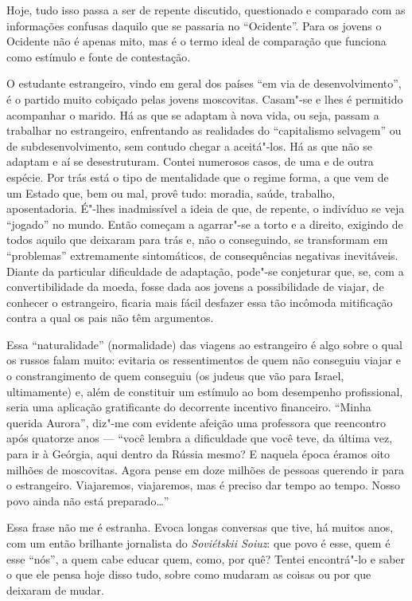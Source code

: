 Hoje, tudo isso passa a ser de repente discutido, questionado e comparado com as informações confusas daquilo que se passaria no ``Ocidente''. Para os jovens o Ocidente não é apenas mito, mas é o termo ideal de comparação que funciona como estímulo e fonte de contestação.

O estudante estrangeiro, vindo em geral dos países ``em via de desenvolvimento'', é o partido muito cobiçado pelas jovens moscovitas. Casam"-se e lhes é permitido acompanhar o marido. Há as que se adaptam à nova vida, ou seja, passam a trabalhar no estrangeiro, enfrentando as realidades do ``capitalismo selvagem'' ou de subdesenvolvimento, sem contudo chegar a aceitá"-los. Há as que não se adaptam e aí se desestruturam. Contei numerosos casos, de uma e de outra espécie. Por trás está o tipo de mentalidade que o regime forma, a que vem de um Estado que, bem ou mal, provê tudo: moradia, saúde, trabalho, aposentadoria. É"-lhes inadmissível a ideia de que, de repente, o indivíduo se veja ``jogado'' no mundo. Então começam a agarrar"-se a torto e a direito, exigindo de todos aquilo que deixaram para trás e, não o conseguindo, se transformam em ``problemas'' extremamente sintomáticos, de consequências negativas inevitáveis. Diante da particular dificuldade de adaptação, pode"-se conjeturar que, se, com a convertibilidade da moeda, fosse dada aos jovens a possibilidade de viajar, de conhecer o estrangeiro, ficaria mais fácil desfazer essa tão incômoda mitificação contra a qual os pais não têm argumentos.

Essa ``naturalidade'' (normalidade) das viagens ao estrangeiro é algo sobre o qual os russos falam muito: evitaria os ressentimentos de quem não conseguiu viajar e o constrangimento de quem conseguiu (os judeus que vão para Israel, ultimamente) e, além de constituir um estímulo ao bom desempenho profissional, seria uma aplicação gratificante do decorrente incentivo financeiro. ``Minha querida Aurora'', diz"-me com evidente afeição uma professora que reencontro após quatorze anos --- ``você lembra a dificuldade que você teve, da última vez, para ir à Geórgia, aqui dentro da Rússia mesmo? E naquela época éramos oito milhões de moscovitas. Agora pense em doze milhões de pessoas querendo ir para o estrangeiro. Viajaremos, viajaremos, mas é preciso dar tempo ao tempo. Nosso povo ainda não está preparado\ldots{}''

Essa frase não me é estranha. Evoca longas conversas que tive, há muitos anos, com um então brilhante jornalista do \emph{Soviétskii Soiuz}: que povo é esse, quem é esse ``nós'', a quem cabe educar quem, como, por quê? Tentei encontrá"-lo e saber o que ele pensa hoje disso tudo, sobre como mudaram as coisas ou por que deixaram de mudar.

